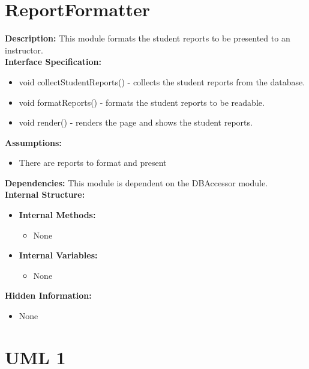 \chapter{ReportFormatter}
\textbf{Description:} This module formats the student reports to be presented to an instructor. \\
\textbf{Interface Specification:}
\begin{itemize}
\item{void collectStudentReports() - collects the student reports from the database. }
\item{void formatReports() - formats the student reports to be readable.}
\item{void render() - renders the page and shows the student reports.}
\end{itemize}
\textbf{Assumptions:}
\begin{itemize}
\item{There are reports to format and present} 
\end{itemize}
\textbf{Dependencies:} This module is dependent on the DBAccessor module. \\ 
\textbf{Internal Structure:}
\begin{itemize}
        	\item{\textbf{Internal Methods:} 
        	\begin{itemize}
        	\item{None}
        	\end{itemize}}
        	\item{\textbf{Internal Variables:} 
        	\begin{itemize}
        	\item{None}
        	\end{itemize}}
\end{itemize}
\textbf{Hidden Information:}
\begin{itemize}
\item{None} 
\end{itemize}





\chapter{UML 1}

